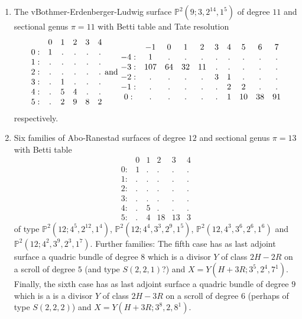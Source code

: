 \documentclass[twoside,12pt, leqno]{amsart}
\def\PP{{\mathbb P}}
\begin{document}
\begin{enumerate}
\item The vBothmer-Erdenberger-Ludwig surface $\PP^{2}(9;3,2^{14},1^{5})$ of degree $11$ and sectional genus $\pi=11$ with Betti table and Tate resolution
$$\begin{matrix}
       & 0 & 1 & 2 & 3 & 4\\
      0: & 1 & . & . & . & .\\
      1: & . & . & . & . & .\\
      2: & . & . & . & . & .\\
      3: & . & 1 & . & . & .\\
      4: & . & 5 & 4 & . & .\\
      5: & . & 2 & 9 & 8 & 2
      \end{matrix}
\hbox{ and  } 
\begin{matrix}
        & -1 & 0 & 1 & 2 & 3 & 4 & 5 & 6 & 7\\
       -4: & 1 & . & . & . & . & . & . & . & .\\
       -3: & 107 & 64 & 32 & 11 & . & . & . & . & .\\
       -2: & . & . & . & . & 3 & 1 & . & . & .\\
       -1: & . & . & . & . & . & 2 & 2 & . & .\\
       0: & . & . & . & . & . & 1 & 10 & 38 & 91
       \end{matrix}
$$
respectively.

\item\label{ARsurf} Six families of Abo-Ranestad surfaces of degree $12$ and sectional genus $\pi=13$ with Betti table
$$\begin{matrix}
       & 0 & 1 & 2 & 3 & 4\\
      0: & 1 & . & . & . & .\\
      1: & . & . & . & . & .\\
      2: & . & . & . & . & .\\
      3: & . & . & . & . & .\\
      4: & . & 5 & . & . & .\\
      5: & . & 4 & 18 & 13 & 3
      \end{matrix}$$
of type $\PP^{2}(12;4^{5},2^{12},1^{4})$, $\PP^{2}(12;4^{4},3^{3},2^{9},1^{5})$, $\PP^{2}(12,4^{3},3^{6},2^{6},1^{6})$ and
$\PP^{2}(12;4^{2},3^{9},2^{3},1^{7})$. Further families:
The fifth case has as last adjoint surface a quadric bundle of degree $8$ which is a divisor $Y$ of class $2H-2R$ on a scroll of degree $5$ (and type $S(2,2,1)$?) and
$X=Y(H+3R;3^{5},2^{4},7^{1})$. Finally, the
sixth case has as last adjoint surface a quadric bundle of degree $9$ which is a is a divisor $Y$ of class $2H-3R$ on a scroll of degree $6$ (perhaps of type $S(2,2,2)$) and
$X=Y(H+3R;3^{8},2,8^{1})$. 


\end{enumerate}
\end{document}

